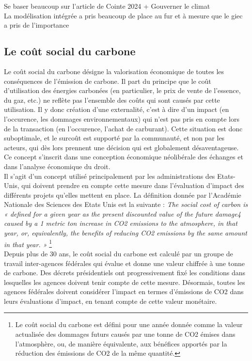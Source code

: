 Se baser beaucoup sur l'article de Cointe 2024 + Gouverner le climat \\

La modélisation intégrée a pris beaucoup de place au fur et à mesure que le giec a pris de l'importance

\subsection{Le coût social du carbone}
\label{sect:1.3.2}

Le coût social du carbone désigne la valorisation économique de toutes les conséquences de l'émission de carbone. Il part du principe que le coût d'utilisation des énergies carbonées (en particulier, le prix de vente de l'essence, du gaz, etc.) ne reflète pas l'ensemble des coûts qui sont causés par cette utilisation. Il y donc création d'une externalité, c'est à dire d'un impact (en l'occurence, les dommages environnementaux) qui n'est pas pris en compte lors de la transaction (en l'occurence, l'achat de carburant). Cette situation est donc suboptimale, et le surcoût est supporté par la communauté, et non par les acteurs, qui dès lors prennent une décision qui est globalement désaventageuse. Ce concept s'inscrit dans une conception économique néolibérale des échanges et dans l'analyse économique du droit.  \\

Il s'agit d'un concept utilisé principalement par les administrations des Etats-Unis, qui doivent prendre en compte cette mesure dans l'évaluation d'impact des différents projets qu'elles mettent en place. La définition donnée par l'Académie Nationale des Sciences des Etats Unis est la suivante : \emph{The social cost of carbon is « defined for a given year as the present discounted value of the future damage4 caused by a 1 metric ton increase in CO2 emissions to the atmosphere, in that year, or, equivalently, the benefits of reducing CO2 emissions by the same amount in that year. » }\footnote{Le coût social du carbone est défini pour une année donnée comme la valeur actualisée des dommages futurs causés par une tonne de CO2 émises dans l'atmosphère, ou, de manière équivalente, aux bénéfices apportés par la réduction des émissions de CO2 de la même quantité.} \\

Depuis plus de 30 ans, le coût social du carbone est calculé par un groupe de travail inter-agences fédérales qui évalue et donne une valeur chiffrée à une tonne de carbone. Des décrets présidentiels ont progressivement fixé les conditions dans lesquelles les agences doivent tenir compte de cette mesure. Désormais, toutes les agences fédérales doivent considérer l'impact en termes d’émissions de CO2 dans leurs évaluations d'impact, en tenant compte de cette valeur monétaire. \\

